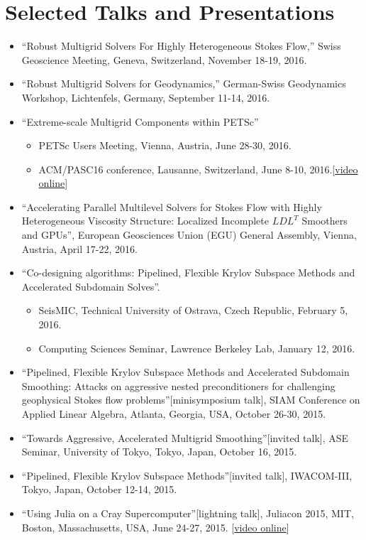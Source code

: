 \documentclass[12pt]{article}
\begin{document}
\section*{Selected Talks and Presentations}
\begin{itemize}
    \item ``Robust Multigrid Solvers For Highly Heterogeneous Stokes Flow,'' Swiss Geoscience Meeting, Geneva, Switzerland, November 18-19, 2016.
\item ``Robust Multigrid Solvers for Geodynamics,'' German-Swiss Geodynamics Workshop, Lichtenfels, Germany, September 11-14, 2016.
  \item ``Extreme-scale Multigrid Components within PETSc''
  \begin{itemize}
    \item PETSc Users Meeting, Vienna, Austria, June 28-30, 2016.
    \item ACM/PASC16 conference, Lausanne, Switzerland, June 8-10, 2016.[\href{http://insidehpc.com/2016/06/extreme-scale-multigrid/}{video online}]
  \end{itemize}
  \item ``Accelerating Parallel Multilevel Solvers for Stokes Flow with Highly Heterogeneous Viscosity Structure: Localized Incomplete $LDL^T$ Smoothers and GPUs'', European Geosciences Union (EGU) General Assembly, Vienna, Austria, April 17-22, 2016.
  \item ``Co-designing algorithms: Pipelined, Flexible Krylov Subspace Methods and  Accelerated Subdomain Solves''. 
  \begin{itemize}
      \item SeisMIC, Technical University of Ostrava, Czech Republic, February 5, 2016.
      \item Computing Sciences Seminar, Lawrence Berkeley Lab, January 12, 2016.
  \end{itemize}
  \item ``Pipelined, Flexible Krylov Subspace Methods and Accelerated Subdomain Smoothing: Attacks on aggressive nested preconditioners for challenging geophysical Stokes flow problems''[minisymposium talk], SIAM Conference on Applied Linear Algebra, Atlanta, Georgia, USA, October 26-30, 2015.
  \item ``Towards Aggressive, Accelerated Multigrid Smoothing''[invited talk], ASE Seminar, University of Tokyo, Tokyo, Japan, October 16, 2015. 
  \item ``Pipelined, Flexible Krylov Subspace Methods''[invited talk], IWACOM-III, Tokyo, Japan, October 12-14, 2015.
  \item ``Using Julia on a Cray Supercomputer''[lightning talk], Juliacon 2015, MIT, Boston, Massachusetts, USA, June 24-27, 2015. [\href{https://www.youtube.com/watch?v=NwyKz2KLdtY}{video online}]
\end{itemize}
\end{document}
